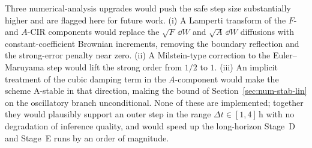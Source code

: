 \begin{remark}\label{rem:num-stab-improvements}
Three numerical-analysis upgrades would push the safe step size
substantially higher and are flagged here for future work. (i) A
Lamperti transform of the $F$- and $A$-CIR components would replace
the $\sqrt{F}\,\dd W$ and $\sqrt{A}\,\dd W$ diffusions with
constant-coefficient Brownian increments, removing the boundary
reflection and the strong-error penalty near zero. (ii) A
Milstein-type correction to the Euler--Maruyama step would lift the
strong order from $1/2$ to $1$. (iii) An implicit treatment of the
cubic damping term in the $A$-component would make the scheme
A-stable in that direction, making the bound of
Section~\ref{sec:num-stab-lin} on the oscillatory branch
unconditional. None of these are implemented; together they would
plausibly support an outer step in the range
$\Delta t \in [1,4]\,\mathrm{h}$ with no degradation of inference
quality, and would speed up the long-horizon Stage~D and Stage~E
runs by an order of magnitude.
\end{remark}
